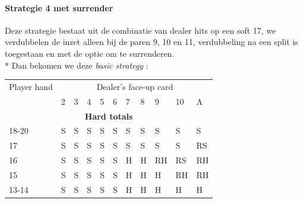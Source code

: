 \documentclass[conference]{IEEEtran}
\begin{document}
\paragraph{Strategie 4 met surrender}

Deze strategie bestaat uit de combinatie van dealer hits op een soft 17, we verdubbelen de inzet alleen bij de paren 9, 10 en 11, verdubbeling na een split is toegestaan en met de optie om te surrenderen.\\*
Dan bekomen we deze \textit{basic strategy} :

\begin{table}[ht]
\tiny
\centering
\begin{tabular}{|l|l|l|l|l|l|l|l|l|l|l|}
\hline

{Player hand} & \multicolumn{10}{c|}{Dealer's face-up card}     \\ \cline{2-11} 
                             & 2 & 3 & 4 & 5 & 6 & 7 & 8 & 9 & 10 & A \\ \hline
\multicolumn{11}{|c|}{\textbf{Hard totals}}                           \\ \hline
18-20       								 & \cellcolor{red!75}S & \cellcolor{red!75}S & \cellcolor{red!75}S & \cellcolor{red!75}S & \cellcolor{red!75}S & \cellcolor{red!75}S & \cellcolor{red!75}S & \cellcolor{red!75}S & \cellcolor{red!75}S & \cellcolor{red!75}S  \\ \hline
17                           & \cellcolor{red!75}S & \cellcolor{red!75}S & \cellcolor{red!75}S & \cellcolor{red!75}S & \cellcolor{red!75}S & \cellcolor{red!75}S & \cellcolor{red!75}S & \cellcolor{red!75}S & \cellcolor{red!75}S & \cellcolor{magenta!80}RS  \\ \hline
16                           & \cellcolor{red!75}S & \cellcolor{red!75}S & \cellcolor{red!75}S & \cellcolor{red!75}S & \cellcolor{red!75}S & \cellcolor{green!50}H & \cellcolor{green!50}H & \cellcolor{magenta!80}RH & \cellcolor{magenta!80}RS & \cellcolor{magenta!80}RH  \\ \hline
15                           & \cellcolor{red!75}S & \cellcolor{red!75}S & \cellcolor{red!75}S & \cellcolor{red!75}S & \cellcolor{red!75}S & \cellcolor{green!50}H & \cellcolor{green!50}H & \cellcolor{green!50}H & \cellcolor{magenta!80}RH & \cellcolor{magenta!80}RH \\ \hline
13-14                        & \cellcolor{red!75}S & \cellcolor{red!75}S & \cellcolor{red!75}S & \cellcolor{red!75}S & \cellcolor{red!75}S & \cellcolor{green!50}H & \cellcolor{green!50}H & \cellcolor{green!50}H & \cellcolor{green!50}H & \cellcolor{green!50}H  \\ \hline

\end{tabular}
\end{table}
\end{document}
